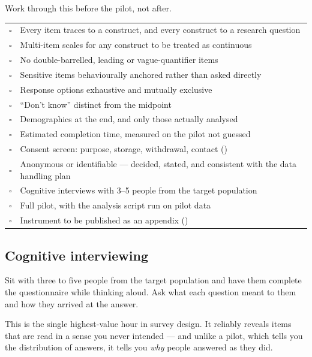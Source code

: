 \begin{templatebox}
Work through this before the pilot, not after.

\medskip
\begin{tabular}{@{}L{0.8cm}L{13.0cm}@{}}
$\square$ & Every item traces to a construct, and every construct to a research
            question \\
$\square$ & Multi-item scales for any construct to be treated as continuous \\
$\square$ & No double-barrelled, leading or vague-quantifier items \\
$\square$ & Sensitive items behaviourally anchored rather than asked directly \\
$\square$ & Response options exhaustive and mutually exclusive \\
$\square$ & ``Don't know'' distinct from the midpoint \\
$\square$ & Demographics at the end, and only those actually analysed \\
$\square$ & Estimated completion time, measured on the pilot not guessed \\
$\square$ & Consent screen: purpose, storage, withdrawal, contact
            () \\
$\square$ & Anonymous or identifiable --- decided, stated, and consistent with
            the data handling plan \\
$\square$ & Cognitive interviews with 3--5 people from the target population \\
$\square$ & Full pilot, with the analysis script run on pilot data \\
$\square$ & Instrument to be published as an appendix
            () \\
\end{tabular}
\end{templatebox}

\subsection{Cognitive interviewing}

Sit with three to five people from the target population and have them complete
the questionnaire while thinking aloud. Ask what each question meant to them
and how they arrived at the answer.

This is the single highest-value hour in survey design. It reliably reveals
items that are read in a sense you never intended --- and unlike a pilot, which
tells you the distribution of answers, it tells you \emph{why} people answered
as they did.

